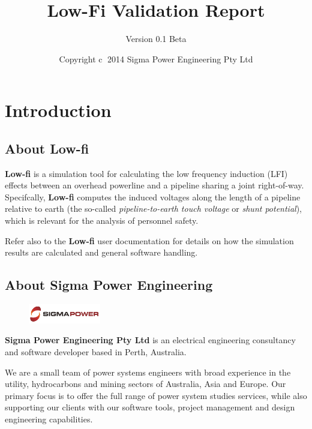 \documentclass{article}
\title{Low-Fi Validation Report}
\author{Version 0.1 Beta}
\date{Copyright \textcircled{c}  2014 Sigma Power Engineering Pty Ltd}
\begin{document}
\pagestyle{plain}
\maketitle

\tableofcontents
\clearpage

\section{Introduction}
\subsection{About Low-fi}
\textbf{Low-fi} is a simulation tool for calculating the low frequency induction (LFI) effects between an overhead powerline and a pipeline sharing a joint right-of-way. Specifcally, \textbf{Low-fi} computes the induced voltages along the length of a pipeline relative to earth (the so-called \emph{pipeline-to-earth touch voltage} or \emph{shunt potential}), which is relevant for the analysis of personnel safety.

Refer also to the \textbf{Low-fi} user documentation for details on how the simulation results are calculated and general software handling. 

\subsection{About Sigma Power Engineering}
\begin{figure}[!ht]
    \includegraphics[width=0.28\textwidth]{./Figures/Sigma_Power.png}
\end{figure}


\textbf{Sigma Power Engineering Pty Ltd} is an electrical engineering consultancy and software developer based in Perth, Australia.

We are a small team of power systems engineers with broad experience in the utility, hydrocarbons and mining sectors of Australia, Asia and Europe. Our primary focus is to offer the full range of power system studies services, while also supporting our clients with our software tools, project management and design engineering capabilities.
\end{document}
